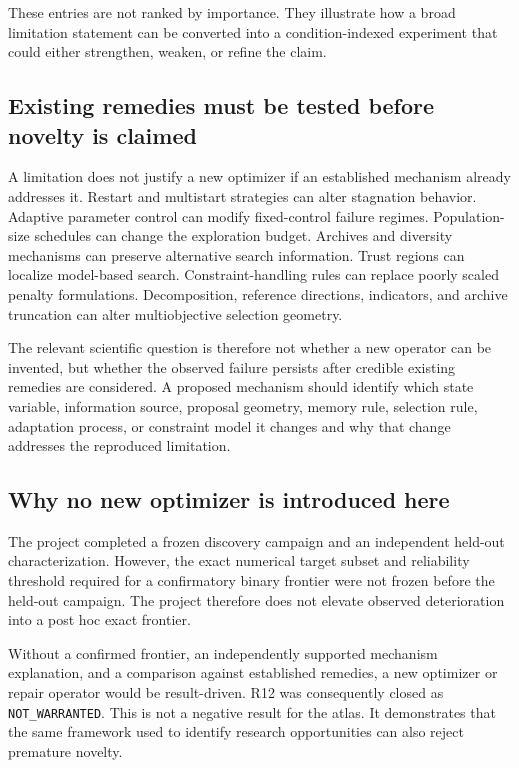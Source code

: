 These entries are not ranked by importance. They illustrate how a broad limitation statement can be converted into a condition-indexed experiment that could either strengthen, weaken, or refine the claim.

\subsection{Existing remedies must be tested before novelty is claimed}

A limitation does not justify a new optimizer if an established mechanism already addresses it. Restart and multistart strategies can alter stagnation behavior. Adaptive parameter control can modify fixed-control failure regimes. Population-size schedules can change the exploration budget. Archives and diversity mechanisms can preserve alternative search information. Trust regions can localize model-based search. Constraint-handling rules can replace poorly scaled penalty formulations. Decomposition, reference directions, indicators, and archive truncation can alter multiobjective selection geometry.

The relevant scientific question is therefore not whether a new operator can be invented, but whether the observed failure persists after credible existing remedies are considered. A proposed mechanism should identify which state variable, information source, proposal geometry, memory rule, selection rule, adaptation process, or constraint model it changes and why that change addresses the reproduced limitation.

\subsection{Why no new optimizer is introduced here}

The project completed a frozen discovery campaign and an independent held-out characterization. However, the exact numerical target subset and reliability threshold required for a confirmatory binary frontier were not frozen before the held-out campaign. The project therefore does not elevate observed deterioration into a post hoc exact frontier.

Without a confirmed frontier, an independently supported mechanism explanation, and a comparison against established remedies, a new optimizer or repair operator would be result-driven. R12 was consequently closed as \texttt{NOT\_WARRANTED}. This is not a negative result for the atlas. It demonstrates that the same framework used to identify research opportunities can also reject premature novelty.

